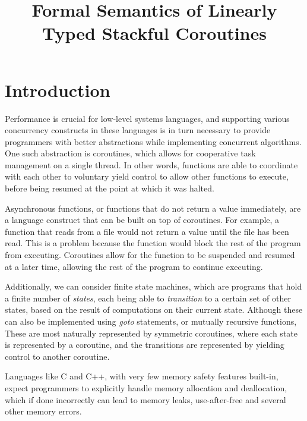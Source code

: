 \documentclass[review,twocolumn]{sigplanconf}
\begin{document}
\title{Formal Semantics of Linearly Typed Stackful Coroutines}
\date{}

\maketitle


\section{Introduction}


Performance is crucial for low-level systems languages, and supporting various concurrency constructs in these languages is in turn necessary to provide programmers with better abstractions while implementing concurrent algorithms. One such abstraction is coroutines, which allows for cooperative task management on a single thread. In other words, functions are able to coordinate with each other to voluntary yield control to allow other functions to execute, before being resumed at the point at which it was halted.

Asynchronous functions, or functions that do not return a value immediately, are a language construct that can be built on top of coroutines. For example, a function that reads from a file would not return a value until the file has been read. This is a problem because the function would block the rest of the program from executing. Coroutines allow for the function to be suspended and resumed at a later time, allowing the rest of the program to continue executing.

Additionally, we can consider finite state machines, which are programs that hold a finite number of \textit{states}, each being able to \textit{transition} to a certain set of other states, based on the result of computations on their current state. Although these can also be implemented using \textit{goto} statements, or mutually recursive functions, These are most naturally represented by symmetric coroutines, where each state is represented by a coroutine, and the transitions are represented by yielding control to another coroutine.

Languages like C and C++, with very few memory safety features built-in, expect programmers to explicitly handle memory allocation and deallocation, which if done incorrectly can lead to memory leaks, use-after-free and several other memory errors.
\end{document}
